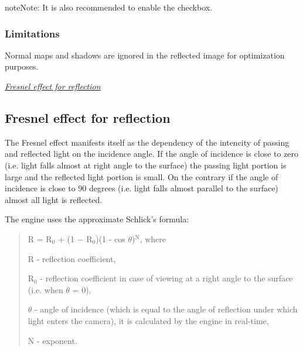 \documentclass[a4paper,12pt,oneside]{sphinxmanual}
\begin{document}
\begin{notice}{note}{Note:}
It is also recommended to enable the  checkbox.
\end{notice}


\subsubsection{Limitations}
\label{materials:id10}
Normal maps and shadows are ignored in the reflected image for optimization purposes.




{\hyperref[materials:fresnel]{\emph{Fresnel effect for reflection}}}




\subsection{Fresnel effect for reflection}
\label{materials:id11}\label{materials:fresnel}\label{materials:index-8}
The Fresnel effect manifests itself as the dependency of the intencity of passing and reflected light on the incidence angle. If the angle of incidence is close to zero (i.e. light falls almost at right angle to the surface) the passing light portion is large and the reflected light portion is small. On the contrary if the angle of incidence is close to 90 degrees (i.e. light falls almost parallel to the surface) almost all light is reflected.

The engine uses the approximate Schlick's formula:
\begin{quote}

R = R$_{\text{0}}$ + (1 − R$_{\text{0}}$)(1 - cos \(\theta\))$^{\text{N}}$, where

R - reflection coefficient,

R$_{\text{0}}$ - reflection coefficient in case of viewing at a right angle to the surface (i.e. when \(\theta\) = 0),

\(\theta\) - angle of incidence (which is equal to the angle of reflection under which light enters the camera), it is calculated by the engine in real-time,

N - exponent.
\end{quote}
\end{document}
